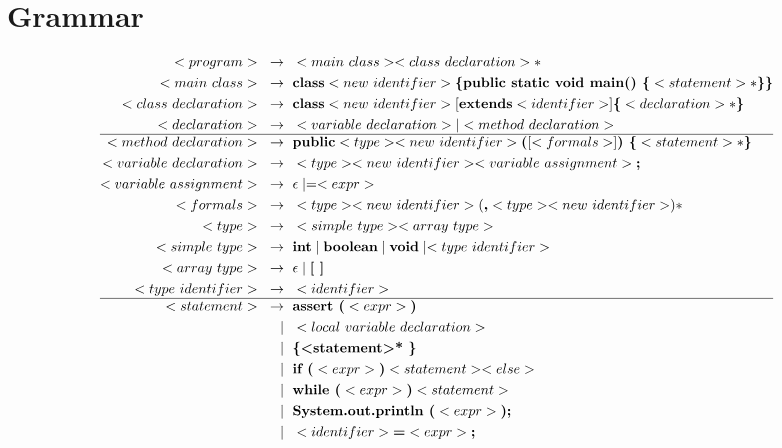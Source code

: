 \documentclass[a4paper,12pt]{article}
\newcommand{\bb}[1]{\textbf{#1}}
\newcommand{\s}{\text{ }}
\newcommand{\bracel}{\textbraceleft}
\newcommand{\bracer}{\textbraceright}
\begin{document}
\section{Grammar}
\begingroup\footnotesize
\begin{align*}
<program>\s \to \s &<main\s class> <class\s declaration>* \\
<main\s class>\s \to \s &\bb{class} <new\s identifier> \bb{\bracel public static void main() \bracel} <statement>* \bb{\bracer \bracer}\\
<class\s declaration>\s \to \s &\bb{class} <new\s identifier> [\bb{extends} <identifier>] \bb{\bracel}<declaration>* \bb{\bracer}\\
<declaration>\s \to \s &<variable\s declaration> | <method\s declaration> \\ 
\hline
<method\s declaration>\s \to \s &\bb{public} <type> <new\s identifier> \bb{(} [ <formals> ] \bb{) \bracel} <statement>* \bb{\bracer}\\
<variable\s declaration>\s \to \s &<type> <new\s identifier> <variable\s assignment>\bb{;}\\
<variable\s assignment>\s \to \s &\epsilon \mid = <expr>\\
<formals>\s \to \s &<type> <new\s identifier> ( \bb{,} <type> <new\s identifier> )*\\
<type>\s \to \s &<simple\s type> <array\s type>\\
<simple\s type>\s \to \s &\bb{int} \mid \bb{boolean} \mid \bb{void} \mid <type\s identifier>\\
<array\s type>\s \to \s &\epsilon \mid \bb{[ ]}\\
<type\s identifier>\s \to \s &<identifier> \\
\hline
<statement>\s \to \s &\bb{assert (} <expr> \bb{)}  \\
             \mid \s &<local\s variable\s declaration>  \\
             \mid \s &\bb{\bracel <statement>* \bracer}  \\
             \mid \s &\bb{if (} <expr> \bb{)} <statement> <else> \\
             \mid \s &\bb{while (} <expr> \bb{)} <statement>  \\
             \mid \s &\bb{System.out.println (} <expr> \bb{);}  \\
             \mid \s &<identifier> \bb{=} <expr> \bb{;}  \\

\end{align*}
\end{document}

